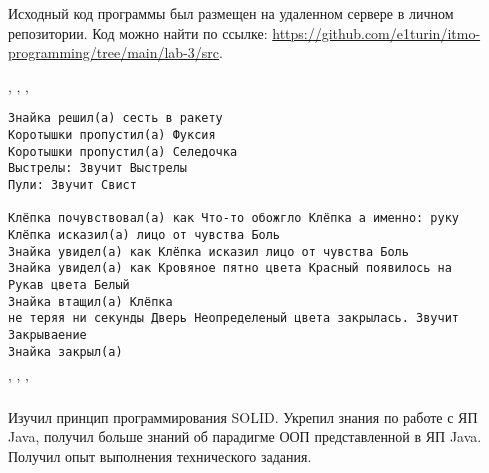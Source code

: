 

Исходный код программы был размещен на удаленном сервере в личном репозитории. Код можно найти по ссылке: \url{https://github.com/e1turin/itmo-programming/tree/main/lab-3/src}.


\begin{center}
, , ,
\end{center}
\begin{verbatim}
Знайка решил(а) сесть в ракету
Коротышки пропустил(а) Фуксия
Коротышки пропустил(а) Селедочка
Выстрелы: Звучит Выстрелы
Пули: Звучит Свист

Клёпка почувствовал(а) как Что-то обожгло Клёпка а именно: руку
Клёпка исказил(а) лицо от чувства Боль
Знайка увидел(а) как Клёпка исказил лицо от чувства Боль
Знайка увидел(а) как Кровяное пятно цвета Красный появилось на 
Рукав цвета Белый
Знайка втащил(а) Клёпка
не теряя ни секунды Дверь Неопределеный цвета закрылась. Звучит 
Закрываение
Знайка закрыл(a)
\end{verbatim}
\begin{center}
' ' '
\end{center}

Изучил принцип программирования SOLID. Укрепил знания по работе с ЯП Java, получил больше знаний об парадигме ООП представленной в ЯП Java. Получил опыт выполнения технического задания.\\
\newpage





